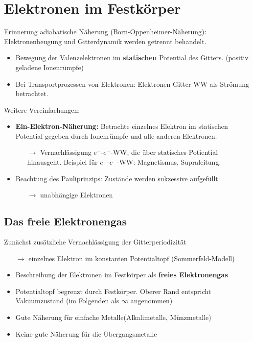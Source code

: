 \section{Elektronen im Festkörper} \label{kap:5}

Erinnerung adiabatische Näherung (Born-Oppenheimer-Näherung):\\
Elektronenbeugung und Gitterdynamik werden getrennt behandelt.
\begin{itemize}
    \item Bewegung der Valenzelektronen im \textbf{statischen} Potential des Gitters. (positiv geladene Ionenrümpfe)
    \item Bei Transportprozessen von Elektronen:
    Elektronen-Gitter-WW als Strömung betrachtet.
\end{itemize}

Weitere Vereinfachungen:
\begin{itemize}
    \item \textbf{Ein-Elektron-Näherung:} Betrachte einzelnes Elektron im statischen Potential gegeben durch Ionenrümpfe und alle anderen Elektronen.
    \begin{itemize}
        \item[$\rightarrow$] Vernachlässigung $e^-$-$e^-$-WW, die über statisches Potiential hinausgeht. Beispiel für $e^-$-$e^-$-WW: Magnetismus, Supraleitung.
    \end{itemize}
    \item Beachtung des Pauliprinzips: Zustände werden sukzessive aufgefüllt
    \begin{itemize}
        \item[$\rightarrow$] unabhängige Elektronen  
    \end{itemize}    
\end{itemize}

\subsection{Das freie Elektronengas} \label{kap:5_1}
Zunächst zusätzliche Vernachlässigung der Gitterperiodizität
\begin{itemize}
    \item[$\rightarrow$] einzelnes Elektron im konstanten Potentialtopf (Sommerfeld-Modell)
    \begin{figure}[H]
        \centering
        
        \label{5_1Graph}
    \end{figure}
    \item Beschreibung der Elektronen im Festkörper als \textbf{freies Elektronengas}
    \item Potentialtopf begrenzt durch Festkörper. Oberer Rand entspricht Vakuumzustand (im Folgenden als $\infty$ angenommen)
    \item Gute Näherung für \glqq einfache Metalle\grqq (Alkalimetalle, Münzmetalle)
    \item Keine gute Näherung für die Übergangsmetalle
\end{itemize}

